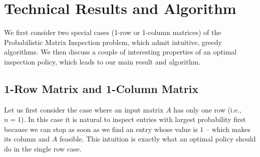 \section{Technical Results and Algorithm} \label{matrix:sec:results}


 We first consider two special cases (1-row or 1-column matrices) of the Probabilistic Matrix Inspection problem, which admit intuitive, greedy algorithms. We then discuss a couple of interesting properties of an optimal inspection policy, which leads to our main result and algorithm.

 \subsection{1-Row Matrix and 1-Column Matrix}
 Let us first consider the case where an input matrix $A$ has only one row (i.e., $n = 1$).
 In this case it is natural to inspect entries with largest probability first because we can stop as soon as we find an entry whose value is $1$ -- which makes its column and $A$ feasible. This intuition is exactly what an optimal policy should do in the single row case.


